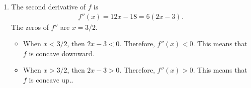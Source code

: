 \begin{enumerate}[label=\alph*)]
\begin{itemize}
		\end{itemize}
	\item The second derivative of $f$ is
		\begin{align*}
		f''(x) = 12x - 18 = 6 (2x - 3) .
		\end{align*}
	The zeros of $f''$ are $x = 3/2$.
		\begin{itemize}
		\item When $x < 3/2$, then $2x - 3 < 0$. Therefore, $f''(x) < 0$. This means that $f$ is concave downward.
		\item When $x > 3/2$, then $2x - 3 > 0$. Therefore, $f''(x) > 0$. This means that $f$ is concave up..
		\end{itemize}
	\end{enumerate}
	
	\newpage
	
